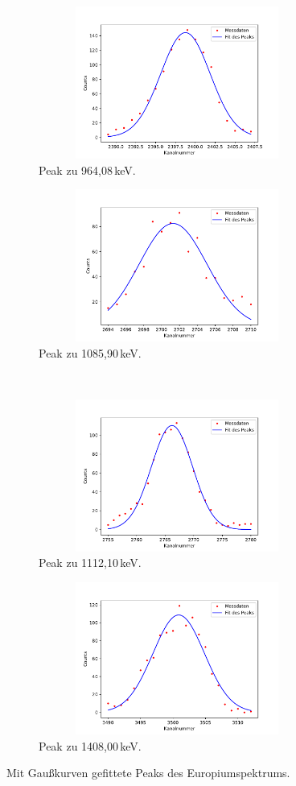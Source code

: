 \begin{figure}
\begin{subfigure}{0.31\textwidth}
        \includegraphics[height=5cm, width=1\textwidth]{germania/peak8/peak8.pdf}
        \caption{Peak zu 964,08\,keV.}
      \end{subfigure}
      \begin{subfigure}{0.31\textwidth}
        \centering
        \includegraphics[height=5cm, width=1\textwidth]{germania/peak9/peak9.pdf}
        \caption{Peak zu 1085,90\,keV.}
      \end{subfigure}\\
      \begin{subfigure}{0.31\textwidth}
        \centering
        \includegraphics[height=5cm, width=1\textwidth]{germania/peak10/peak10.pdf}
        \caption{Peak zu 1112,10\,keV.}
      \end{subfigure}
      \begin{subfigure}{0.31\textwidth}
        \centering
        \includegraphics[height=5cm, width=1\textwidth]{germania/peak11/peak11.pdf}
        \caption{Peak zu 1408,00\,keV.}
      \end{subfigure}
      \caption{Mit Gaußkurven gefittete Peaks des Europiumspektrums.}
      \label{fig:fits}
    \end{figure}

\printbibliography


